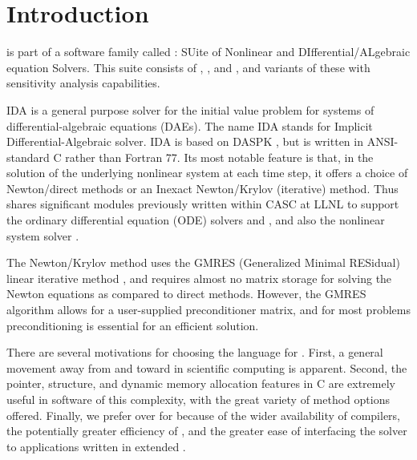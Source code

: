 \chapter{Introduction}\label{s:intro}

{\ida} is part of a software family called {\sundials}: 
SUite of Nonlinear and DIfferential/ALgebraic equation Solvers.  
This suite consists of {\cvode}, {\kinsol}, and {\ida}, and variants of these
with sensitivity analysis capabilities.


IDA is a general purpose solver for the initial value problem for
systems of differential-algebraic equations (DAEs).  The name IDA
stands for Implicit Differential-Algebraic solver.  IDA is based on
DASPK \cite{BHP:94,BHP:98}, but is written in ANSI-standard C
rather than Fortran 77.  Its most notable feature is that, in the
solution of the underlying nonlinear system at each time step, it
offers a choice of Newton/direct methods or an Inexact Newton/Krylov
(iterative) method.  Thus {\ida} shares significant modules previously
written within CASC at LLNL to support the ordinary differential
equation (ODE) solvers {\cvode} \cite{CoHi:94,CoHi:96} and {\pvode}
\cite{ByHi:98,ByHi:99}, and also the nonlinear system solver {\kinsol}
\cite{TaHi:98}.

The Newton/Krylov method uses the GMRES (Generalized Minimal RESidual)
linear iterative method \cite{SaSc:86}, and requires almost no matrix
storage for solving the Newton equations as compared to direct
methods.  However, the GMRES algorithm allows for a user-supplied
preconditioner matrix, and for most problems preconditioning is
essential for an efficient solution.

There are several motivations for choosing the {\C} language for {\ida}.
First, a general movement away from {\F} and toward {\C} in scientific
computing is apparent.  Second, the pointer, structure, and dynamic
memory allocation features in C are extremely useful in software of
this complexity, with the great variety of method options offered.
Finally, we prefer {\C} over {\CPP} for {\ida} because of the wider
availability of {\C} compilers, the potentially greater efficiency of {\C},
and the greater ease of interfacing the solver to applications written
in extended {\F}.

